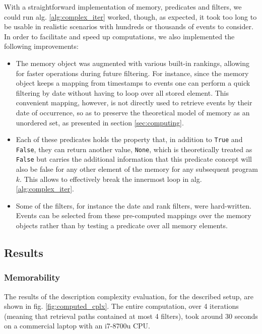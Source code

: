 \documentclass[conference]{IEEEtran}
\begin{document}
With a straightforward implementation of memory, predicates and filters, we could run alg. \ref{alg:complex_iter} worked, though, as expected, it took too
long to be usable in realistic scenarios with hundreds or thousands of events to
consider. In order to facilitate and speed up computations, we also implemented
the following improvements:
\begin{itemize}
  \item The memory object was augmented with various built-in rankings, allowing
for faster operations during future filtering. For instance, since the memory
object keeps a mapping from timestamps to events one can perform a quick
filtering by date without having to loop over all stored element. This convenient mapping,
however, is not directly used to retrieve events by their date of occurrence, so as to
preserve the theoretical model of memory as an unordered set, as presented in
section \ref{sec:computing}.

  \item Each of these predicates holds the property that, in addition to
\texttt{True} and \texttt{False}, they can return another value,
\texttt{None}, which is theoretically treated as \texttt{False} but carries
the additional information that this predicate concept will also be false for
any other element of the memory for any subsequent program $k$. This allows to
effectively break the innermost loop in alg. \ref{alg:complex_iter}.

\item Some of the filters, for instance the date and rank filters, were
hard-written. Events can be selected from these pre-computed mappings over the memory objects
rather than by testing a predicate over all memory elements.
\end{itemize}


\subsection{Results}

\subsubsection{Memorability}

The results of the description complexity evaluation, for the described setup,
are shown in fig. \ref{fig:computed_cplx}. The entire computation, over 4
iterations (meaning that retrieval paths contained at most 4 filters), took
around 30 seconds on a commercial laptop with an i7-8700u CPU.
\end{document}
